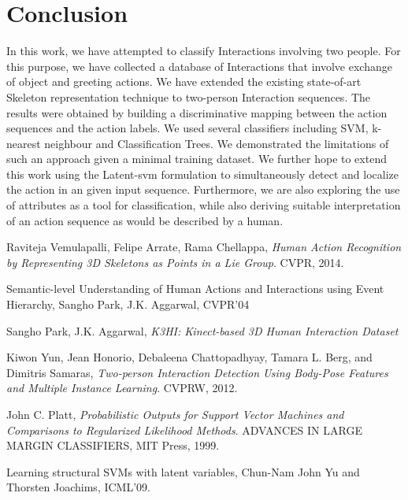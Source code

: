 \documentclass[10pt,twocolumn,letterpaper]{article}
\begin{document}
\section{Conclusion}
In this work, we have attempted to classify Interactions involving two people. For this purpose, we have collected a database of Interactions that involve exchange of object and greeting actions. We have extended the existing state-of-art Skeleton representation technique to two-person Interaction sequences. The results were obtained by building a discriminative mapping between the action sequences and the action labels. We used several classifiers including SVM, k-nearest neighbour and Classification Trees. We demonstrated the limitations of such an approach given a minimal training dataset. We further hope to extend this work using the Latent-svm formulation to simultaneously detect and localize the action in an given input sequence. Furthermore, we are also exploring the use of attributes as a tool for classification, while also deriving suitable interpretation of an action sequence as would be described by a human. 

\begin{thebibliography}{9}

  Raviteja  Vemulapalli,
  Felipe Arrate,
  Rama Chellappa,
  \emph{Human Action Recognition by Representing 3D Skeletons as Points in a Lie Group}.
  CVPR,
  2014.

 Semantic-level Understanding of Human Actions and Interactions using Event Hierarchy, Sangho Park, J.K. Aggarwal, CVPR'04

	Sangho Park,
	J.K. Aggarwal,
	\emph{K3HI: Kinect-based 3D Human Interaction Dataset}

	Kiwon Yun, Jean Honorio, Debaleena Chattopadhyay, Tamara L. Berg, and Dimitris Samaras,
	\emph{Two-person Interaction Detection Using Body-Pose Features and Multiple Instance Learning}.
	CVPRW,
	2012.
	
	John C. Platt,
	\emph{Probabilistic Outputs for Support Vector Machines and Comparisons to Regularized Likelihood Methods}.
	ADVANCES IN LARGE MARGIN CLASSIFIERS, MIT Press, 1999.
	 
	

 Learning structural SVMs with latent variables, Chun-Nam John Yu and Thorsten Joachims, ICML'09.



\end{thebibliography}
\end{document}
